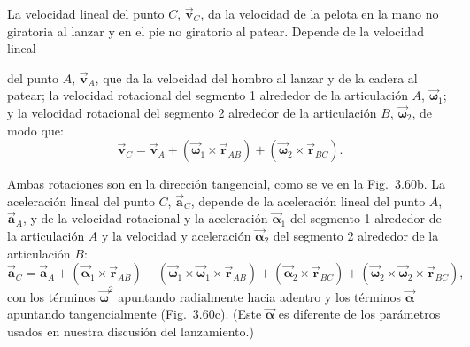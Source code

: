 \documentclass[12pt]{book}
\begin{document}
La velocidad lineal del punto $C$, $\vec{\mathbf{v}}_C$, da la velocidad de la pelota en la mano no giratoria al lanzar y en el pie no giratorio al patear. Depende de la velocidad lineal


del punto $A$, $\vec{\mathbf{v}}_A$, que da la velocidad del hombro al lanzar y de la cadera al patear; la velocidad rotacional del segmento 1 alrededor de la articulación $A$, $\vec{\mathbf{\omega}}_1$; y la velocidad rotacional del segmento 2 alrededor de la articulación $B$, $\vec{\mathbf{\omega}}_2$, de modo que:
\begin{equation}
\vec{\mathbf{v}}_C = \vec{\mathbf{v}}_A + (\vec{\mathbf{\omega}}_1 \times \vec{\mathbf{r}}_{AB}) + (\vec{\mathbf{\omega}}_2 \times \vec{\mathbf{r}}_{BC}).
\label{eq:3.95}
\end{equation}

Ambas rotaciones son en la dirección tangencial, como se ve en la Fig.~3.60b. La aceleración lineal del punto $C$, $\vec{\mathbf{a}}_C$, depende de la aceleración lineal del punto $A$, $\vec{\mathbf{a}}_A$, y de la velocidad rotacional y la aceleración $\vec{\mathbf{\alpha}}_1$ del segmento 1 alrededor de la articulación $A$ y la velocidad y aceleración $\vec{\mathbf{\alpha}}_2$ del segmento 2 alrededor de la articulación $B$:
\begin{equation}
\vec{\mathbf{a}}_C = \vec{\mathbf{a}}_A + (\vec{\mathbf{\alpha}}_1 \times \vec{\mathbf{r}}_{AB}) + (\vec{\mathbf{\omega}}_1 \times \vec{\mathbf{\omega}}_1 \times \vec{\mathbf{r}}_{AB}) + (\vec{\mathbf{\alpha}}_2 \times \vec{\mathbf{r}}_{BC}) + (\vec{\mathbf{\omega}}_2 \times \vec{\mathbf{\omega}}_2 \times \vec{\mathbf{r}}_{BC}),
\label{eq:3.96}
\end{equation}
con los términos $\vec{\mathbf{\omega}}^2$ apuntando radialmente hacia adentro y los términos $\vec{\mathbf{\alpha}}$ apuntando tangencialmente (Fig.~3.60c). (Este $\vec{\mathbf{\alpha}}$ es diferente de los parámetros usados en nuestra discusión del lanzamiento.)
\end{document}
